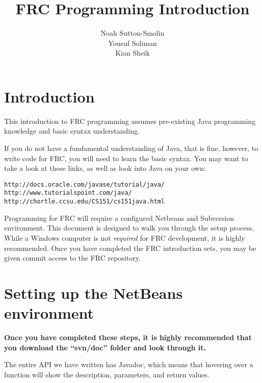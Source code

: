 \documentclass[a4paper]{article}
\title{FRC Programming Introduction}
\author{Noah Sutton-Smolin\\Yousuf Soliman\\Kian Sheik}
\begin{document}
\maketitle

\section{Introduction}

This introduction to FRC programming assumes pre-existing Java programming knowledge and basic syntax understanding.

If you do not have a fundamental understanding of Java, that is fine, however, to write code for FRC, you will need to learn the basic syntax. You may want to take a look at these links, as well as look into Java on your own:

\begin{verbatim}http://docs.oracle.com/javase/tutorial/java/
http://www.tutorialspoint.com/java/
http://chortle.ccsu.edu/CS151/cs151java.html\end{verbatim}

Programming for FRC will require a configured Netbeans and Subversion environment. This document is designed to walk you through the setup process. While a Windows computer is not \textit{required} for FRC development, it is highly recommended. Once you have completed the FRC introduction sets, you may be given commit access to the FRC repository.

\section{Setting up the NetBeans environment}

\textbf{Once you have completed these steps, it is highly recommended that you download the ``svn/doc'' folder and look through it.}

The entire API we have written has Javadoc, which means that hovering over a function will show the description, parameters, and return values.
\end{document}
